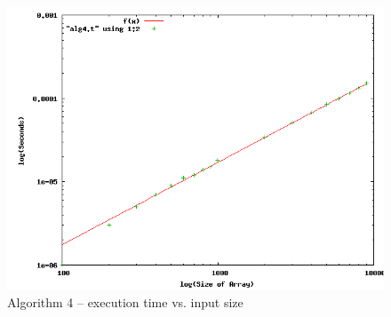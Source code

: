 \documentclass[letterpaper,10pt]{article}
\begin{document}
		\begin{figure}[!htb]
			\centering
			\includegraphics[scale=.5]{timingfiles/alg4plotlog.png}
			\caption{Algorithm 4 -- execution time vs. input size}
			\label{fig:alg4}
		\end{figure}
\end{document}
